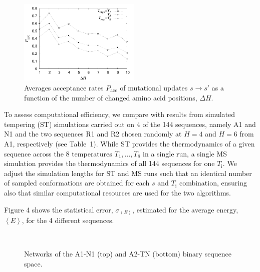 \documentclass[%
 aip,
rsi,%
 amsmath,amssymb,
 reprint,%
]{revtex4-1}
\newcommand	 {\sbar}	{{s}}
\begin{document}
\begin{figure}
\includegraphics[width=5.8cm]{Pacc}
\caption{Averages acceptance rates $P_\mathrm{acc}$ of mutational updates $\sbar\rightarrow\sbar'$ as a function of the number of changed amino acid positions, $\Delta H$.}
\end{figure}

To assess computational efficiency, we compare with results from simulated tempering (ST) simulations carried out on 4 of the 144 sequences, namely A1 and N1 and the two sequences R1 and R2 chosen randomly at $H=4$ and $H=6$ from A1, respectively (see Table~1). While ST provides the thermodynamics of a given sequence across the 8 temperatures $T_1, ..., T_8$ in a single run, a single MS simulation provides the thermodynamics of all 144 sequences for one $T_\mathrm{i}$. We adjust the simulation lengths for ST and MS runs such that an identical number of sampled conformations are obtained for each $\sbar$ and $T_\mathrm{i}$ combination, ensuring also that similar computational resources are used for the two algorithms. 

Figure 4 shows the statistical error, $\sigma_{\left <E\right>}$, estimated for the average energy, $\left <E\right >$, for the 4 different sequences. 

\begin{figure}
\\
\caption{Networks of the A1-N1 (top) and A2-TN (bottom) binary sequence space. }
\end{figure}
\end{document}
